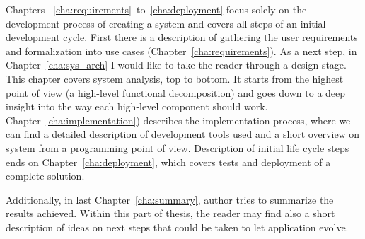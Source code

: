 Chapters ~\ref{cha:requirements}~to~\ref{cha:deployment} focus solely on the development process of creating a system and covers all steps of an initial development cycle. First there is a description of gathering the user requirements and formalization into use cases (Chapter~\ref{cha:requirements}). As a next step, in Chapter~\ref{cha:sys_arch} I would like to take the reader through a design stage. This chapter covers system analysis, top to bottom. It starts from the highest point of view (a high-level functional decomposition) and goes down to a deep insight into the way each high-level component should work. Chapter~\ref{cha:implementation}) describes the implementation process, where we can find a detailed description of development tools used and a short overview on system from a programming point of view. Description of initial life cycle steps ends on Chapter~\ref{cha:deployment}, which covers tests and deployment of a complete solution.

Additionally, in last Chapter~\ref{cha:summary}, author tries to summarize the results achieved. Within this part of thesis, the reader may find also a short description of ideas on next steps that could be taken to let application evolve.
